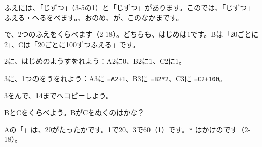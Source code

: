 ふえには、「じずつ」（3-5の1）と「じずつ」があります。このでは、「じずつ」ふえる・へるをべます。、おのめ、が、このなかまです。

\begin{yattemiyou}[「100\R{個}{こ}ずつ」と「2\R{倍}{ばい}ずつ」、どっちが\R{多}{おお}い？]
で、2つのふえをくらべます（2-18）。どちらも、はじめは1です。Bは「20ごとに2」、Cは「20ごとに100ずつふえる」です。
\begin{enumerate}[label={\bkcircled[bkGreen]{\arabic*}}, leftmargin=2.4\zw, itemsep=1pt, topsep=3pt]
\item 2に、はじめのようすをれよう：A2に0、B2に1、C2に1。
\item 3に、1つのをうをれよう：A3に \texttt{=A2+1}、B3に \texttt{=B2*2}、C3に \texttt{=C2+100}。
\item 3をんで、14までへコピーしよう。
\item BとCをくらべよう。BがCをぬくのはかな？
\end{enumerate}
\par\vspace{2pt}
\noindent\begin{minipage}[t]{0.47\linewidth}\vspace{0pt}\centering
{}
\end{minipage}\hfill
\begin{minipage}[t]{0.5\linewidth}\vspace{0pt}
Aの「」は、20がたったかです。1で20、3で60（1）です。\texttt{*} はかけのです（2-18）。
\end{minipage}
\end{yattemiyou}

